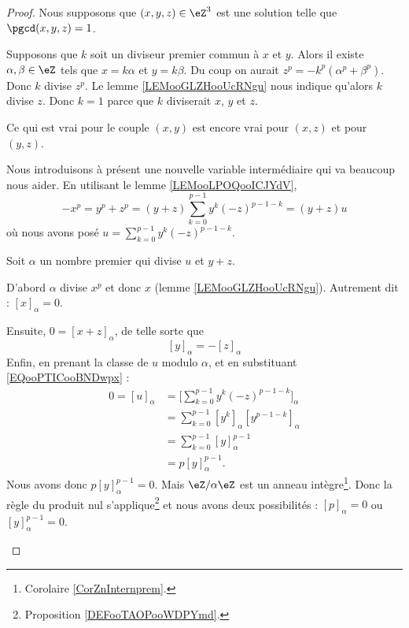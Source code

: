 \begin{proof}
	Nous supposons que \( (x,y,z)\in \eZ^3\) est une solution telle que \( \pgcd(x,y,z)=1\).
	\begin{subproof}
		Supposons que \( k\) soit un diviseur premier commun à \( x\) et \( y\). Alors il existe \( \alpha,\beta\in \eZ\) tels que \( x=k\alpha\) et \( y=k\beta\). Du coup on aurait \( z^p=-k^p(\alpha^p+\beta^p)\). Donc \( k\) divise \( z^p\). Le lemme \ref{LEMooGLZHooUcRNgu} nous indique qu'alors \( k\) divise \( z\). Donc \( k=1\) parce que \( k\) diviserait \( x\), \( y\) et \( z\).

		Ce qui est vrai pour le couple \( (x,y)\) est encore vrai pour \( (x,z)\) et pour \( (y,z)\).

		\spitem[Le fameux \( u\)]
		Nous introduisons à présent une nouvelle variable intermédiaire qui va beaucoup nous aider. En utilisant le lemme \ref{LEMooLPOQooICJYdV},
		\begin{equation}
			-x^p=y^p+z^p=(y+z)\sum_{k=0}^{p-1}y^k(-z)^{p-1-k}=(y+z)u
		\end{equation}
		où nous avons posé \( u=\sum_{k=0}^{p-1}y^k(-z)^{p-1-k}\).

		\spitem[\( \pgcd(u,y+z)=1\)]
		Soit \( \alpha\) un nombre premier qui divise \( u\) et \( y+z\).

		D'abord \( \alpha\) divise \( x^p\) et donc \( x\) (lemme \ref{LEMooGLZHooUcRNgu}). Autrement dit : \( [x]_{\alpha}=0\).

		Ensuite, \( 0=[x+z]_{\alpha}\), de telle sorte que
		\begin{equation}        \label{EQooPTICooBNDwpx}
			[y]_{\alpha}=-[z]_{\alpha}
		\end{equation}
		Enfin, en prenant la classe de \( u\) modulo \( \alpha\), et en substituant \eqref{EQooPTICooBNDwpx} :
		\begin{subequations}
			\begin{align}
				0=[u]_{\alpha} & =\big[ \sum_{k=0}^{p-1}y^k(-z)^{p-1-k} \big]_{\alpha} \\
				               & =\sum_{k=0}^{p-1}[y^k]_{\alpha}[y^{p-1-k}]_{\alpha}   \\
				               & =\sum_{k=0}^{p-1}[y]^{p-1}_{\alpha}                   \\
				               & =p[y]_{\alpha}^{p-1}.
			\end{align}
		\end{subequations}
		Nous avons donc \( p[y]_{\alpha}^{p-1}=0\). Mais \(  \eZ/\alpha\eZ\) est un anneau intègre\footnote{Corolaire \ref{CorZnInternprem}.}. Donc la règle du produit nul s'applique\footnote{Proposition \ref{DEFooTAOPooWDPYmd}.} et nous avons deux possibilités : \( [p]_{\alpha}=0\) ou \( [y]_{\alpha}^{p-1}=0\).


\end{subproof}
\end{proof}
